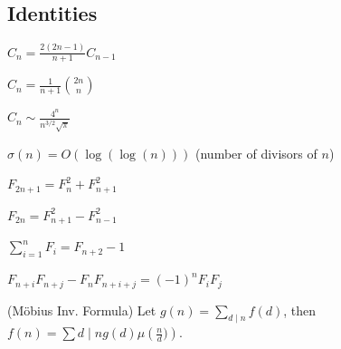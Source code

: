 \subsection{Identities}
{
	$C_n = \frac{2(2n-1)}{n+1} C_{n-1}$

	$C_n = \frac{1}{n+1} \binom{2n}{n}$

	$C_n \sim \frac{4^n}{n^{3/2}\sqrt{\pi}}$

	$\sigma(n) = O(\log(\log(n)))$ (number of divisors of $n$)

	$F_{2n+1} = F_{n}^2 + F_{n+1}^2$

	$F_{2n} = F_{n+1}^2 - F_{n-1}^2$

	$\sum_{i=1}^n F_i = F_{n+2}-1$

	$F_{n+i}F_{n+j} - F_nF_{n+i+j} = (-1)^n F_iF_j$

	(Möbius Inv. Formula)
	Let $g(n) = \sum_{d\mid n} f(d)$, then $f(n)=\sum{d\mid n} g(d) \mu\left(\frac{n}{d})\right)$.
}
